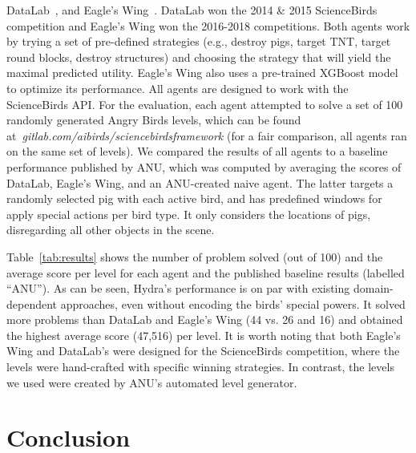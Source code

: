 \documentclass[letterpaper]{article}
\begin{document}
DataLab~\cite{borovicka2014datalab}, and
Eagle's Wing~\cite{wang2017description}.
DataLab won the 2014 \& 2015 ScienceBirds competition and Eagle's Wing won the 2016-2018 competitions.
Both agents work by trying a set of pre-defined strategies (e.g., destroy pigs, target TNT, target round blocks, destroy structures) and choosing the strategy that will yield the maximal predicted utility.
Eagle's Wing also uses a pre-trained XGBoost model to optimize its performance. %
All agents are designed to work with the ScienceBirds API. For the evaluation, each agent attempted to solve a set of 100 randomly generated Angry Birds levels, which can be found at~\emph{gitlab.com/aibirds/sciencebirdsframework} (for a fair comparison, all agents ran on the same set of levels).
We compared the results of all agents to a baseline performance published by ANU, which was computed by averaging the scores of
DataLab,
Eagle's Wing,
and an ANU-created naive agent.
The latter targets a randomly selected pig with each active bird, and has predefined windows for apply special actions per bird type. It only considers the locations of pigs, disregarding all other objects in the scene.




Table~\ref{tab:results} shows the number of problem solved (out of 100) and the average score per level for each agent and the published baseline results (labelled ``ANU'').
As can be seen, Hydra's performance is on par with existing domain-dependent approaches, even without encoding the birds' special powers. It solved more problems than DataLab and Eagle's Wing (44 vs. 26 and 16) and obtained the highest average score (47,516) per level.
It is worth noting that both Eagle's Wing and DataLab's were designed for the ScienceBirds competition, where the levels were hand-crafted with specific winning strategies. In contrast, the levels we used were created by ANU's automated level generator.

















\section{Conclusion}
\end{document}
